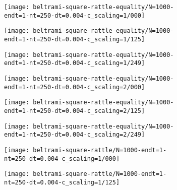 \documentclass[11pt, oneside]{article}   	%
\begin{document}
\begin{figure}[H]
     \begin{subfigure}[t]{0.25\textwidth}
        \centering
        \texttt{[image: beltrami-square-rattle-equality/N=1000-endt=1-nt=250-dt=0.004-c\_scaling=1/000]}
        \caption{} \label{fig:beltrami-flow-000-e1}
    \end{subfigure}
    \begin{subfigure}[t]{0.25\textwidth}
        \centering
        \texttt{[image: beltrami-square-rattle-equality/N=1000-endt=1-nt=250-dt=0.004-c\_scaling=1/125]}
        \caption{} \label{fig:beltrami-flow-125-e1}
    \end{subfigure}
   \begin{subfigure}[t]{0.25\textwidth}
        \centering
	\texttt{[image: beltrami-square-rattle-equality/N=1000-endt=1-nt=250-dt=0.004-c\_scaling=1/249]}
        \caption{} \label{fig:beltrami-flow-249-e1}
    \end{subfigure}
   \begin{subfigure}[t]{0.25\textwidth}
        \centering
        \texttt{[image: beltrami-square-rattle-equality/N=1000-endt=1-nt=250-dt=0.004-c\_scaling=2/000]}
        \caption{} \label{fig:beltrami-flow-000-e2}
    \end{subfigure}
   \begin{subfigure}[t]{0.25\textwidth}
        \centering
        \texttt{[image: beltrami-square-rattle-equality/N=1000-endt=1-nt=250-dt=0.004-c\_scaling=2/125]}
        \caption{} \label{fig:beltrami-flow-125-e2}
    \end{subfigure}
   \begin{subfigure}[t]{0.25\textwidth}
        \centering
	\texttt{[image: beltrami-square-rattle-equality/N=1000-endt=1-nt=250-dt=0.004-c\_scaling=2/249]}
        \caption{} \label{fig:beltrami-flow-249-e2}
    \end{subfigure}
   \begin{subfigure}[t]{0.25\textwidth}
        \centering
        \texttt{[image: beltrami-square-rattle/N=1000-endt=1-nt=250-dt=0.004-c\_scaling=1/000]}
        \caption{} \label{fig:beltrami-flow-000-i}
    \end{subfigure}
   \begin{subfigure}[t]{0.25\textwidth}
        \centering
        \texttt{[image: beltrami-square-rattle/N=1000-endt=1-nt=250-dt=0.004-c\_scaling=1/125]}
        \caption{} \label{fig:beltrami-flow-125-i}
    \end{subfigure}

\end{figure}
\end{document}
